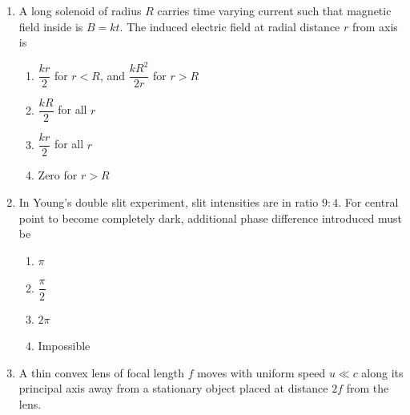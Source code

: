 \documentclass[12pt]{article}
\begin{document}
\begin{enumerate}
\begin{enumerate}
\item $K$
\item $K^2$
\item $\dfrac{1}{K}$
\item $\sqrt{K}$
\end{enumerate}

\item A long solenoid of radius $R$ carries time varying current such that magnetic field inside is $B=kt$. The induced electric field at radial distance $r$ from axis is

\begin{enumerate}
\item $\dfrac{kr}{2}$ for $r<R$, and $\dfrac{kR^2}{2r}$ for $r>R$
\item $\dfrac{kR}{2}$ for all $r$
\item $\dfrac{kr}{2}$ for all $r$
\item Zero for $r>R$
\end{enumerate}

\item In Young’s double slit experiment, slit intensities are in ratio $9:4$. For central point to become completely dark, additional phase difference introduced must be

\begin{center}
\end{center}

\begin{enumerate}
\item $\pi$
\item $\dfrac{\pi}{2}$
\item $2\pi$
\item Impossible
\end{enumerate}

\item A thin convex lens of focal length $f$ moves with uniform speed $u \ll c$ along its principal axis away from a stationary object placed at distance $2f$ from the lens.


\end{enumerate}
\end{document}
